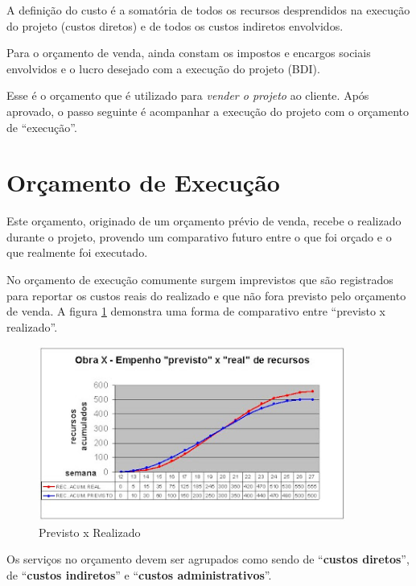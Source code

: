 A definição do custo é a somatória de todos os recursos desprendidos na execução do projeto (custos diretos) e de todos os custos indiretos envolvidos.

Para o orçamento de venda, ainda constam os impostos e encargos sociais envolvidos e o lucro desejado com a execução do projeto (BDI).

Esse é o orçamento que é utilizado para \emph{vender o projeto} ao cliente. Após aprovado, o passo seguinte é acompanhar a execução do projeto com o orçamento de ``execução''.

\section{Orçamento de Execução}

Este orçamento, originado de um orçamento prévio de venda, recebe o realizado durante o projeto, provendo um comparativo futuro entre o que foi orçado e o que realmente foi executado. 

No orçamento de execução comumente surgem imprevistos que são registrados para reportar os custos reais do realizado e que não fora previsto pelo orçamento de venda. A figura \ref{fig:curva_abc} demonstra uma forma de comparativo entre ``previsto x realizado''.


\begin{figure}[htb]
	\centering
	\includegraphics[width=0.9\textwidth]{figuras/curva_abc.jpg}
	\caption[Curva ABC]{Previsto x Realizado}
	\label{fig:curva_abc}
\end{figure}

Os serviços no orçamento devem ser agrupados como sendo de ``\textbf{custos diretos}'', de ``\textbf{custos indiretos}'' e ``\textbf{custos administrativos}''.
